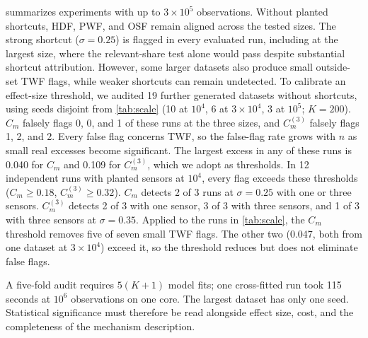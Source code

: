 \documentclass[conference]{IEEEtran}
\begin{document}
 summarizes experiments with up to $3\times10^5$ observations. Without planted shortcuts, HDF, PWF, and OSF remain aligned across the tested sizes. The strong shortcut ($\sigma=0.25$) is flagged in every evaluated run, including at the largest size, where the relevant-share test alone would pass despite substantial shortcut attribution. However, some larger datasets also produce small outside-set TWF flags, while weaker shortcuts can remain undetected. To calibrate an effect-size threshold, we audited 19 further generated datasets without shortcuts, using seeds disjoint from \cref{tab:scale} (10 at $10^4$, 6 at $3\times10^4$, 3 at $10^5$; $K=200$). $C_m$ falsely flags 0, 0, and 1 of these runs at the three sizes, and $C^{(3)}_m$ falsely flags 1, 2, and 2. Every false flag concerns TWF, so the false-flag rate grows with $n$ as small real excesses become significant. The largest excess in any of these runs is 0.040 for $C_m$ and 0.109 for $C^{(3)}_m$, which we adopt as thresholds. In 12 independent runs with planted sensors at $10^4$, every flag exceeds these thresholds ($C_m\geq0.18$, $C^{(3)}_m\geq0.32$). $C_m$ detects 2 of 3 runs at $\sigma=0.25$ with one or three sensors. $C^{(3)}_m$ detects 2 of 3 with one sensor, 3 of 3 with three sensors, and 1 of 3 with three sensors at $\sigma=0.35$. Applied to the runs in \cref{tab:scale}, the $C_m$ threshold removes five of seven small TWF flags. The other two (0.047, both from one dataset at $3\times10^4$) exceed it, so the threshold reduces but does not eliminate false flags.

A five-fold audit requires $5(K+1)$ model fits; one cross-fitted run took 115 seconds at $10^6$ observations on one core. The largest dataset has only one seed. Statistical significance must therefore be read alongside effect size, cost, and the completeness of the mechanism description.




\end{document}
